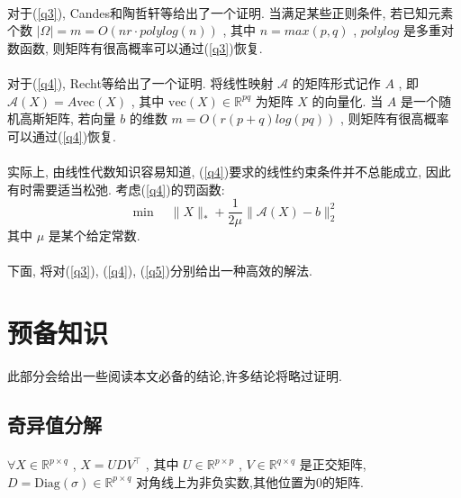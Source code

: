 \documentclass[a4paper, UTF8]{ctexart}				%
\numberwithin{equation}{section}				%
\begin{document}
			\paragraph{}
				\quad 对于(\ref{q3}), Candes和陶哲轩等给出了一个证明. 当满足某些正则条件, 若已知元素个数 $\lvert{\Omega}\rvert = m = O(nr \cdot polylog(n))$ , 其中 $n=max(p,q)$ , $polylog$ 是多重对数函数, 则矩阵有很高概率可以通过(\ref{q3})恢复.

			\paragraph{}
				\quad 对于(\ref{q4}), Recht等给出了一个证明. 将线性映射 $\mathcal{A}$ 的矩阵形式记作 $A$ , 即 $\mathcal{A}(X) = A\text{vec}(X)$ , 其中 $\text{vec}(X) \in \mathbb{R}^{pq}$ 为矩阵 $X$ 的向量化. 当 $A$ 是一个随机高斯矩阵, 若向量 $b$ 的维数 $m = O(r(p + q)log(pq))$ , 则矩阵有很高概率可以通过(\ref{q4})恢复.

			\paragraph{}
				\quad 实际上, 由线性代数知识容易知道, (\ref{q4})要求的线性约束条件并不总能成立, 因此有时需要适当松弛. 考虑(\ref{q4})的罚函数:
				\begin{equation}\label{q5}
					\min \quad \lVert{X}\rVert_*+ \frac{1}{2\mu} \lVert{\mathcal{A}(X) - b}\rVert_2^2
				\end{equation}
				其中 $\mu$ 是某个给定常数.

			\paragraph{}
				\quad 下面, 将对(\ref{q3}), (\ref{q4}), (\ref{q5})分别给出一种高效的解法.

	\section{预备知识}
		此部分会给出一些阅读本文必备的结论,许多结论将略过证明.
		\subsection{奇异值分解}
			\paragraph{}
				\quad $\forall X \in \mathbb{R}^{p \times q}$ , $X = U D V^\top$ , 其中 $U \in \mathbb{R}^{p \times p}$ , $V \in \mathbb{R}^{q \times q}$ 是正交矩阵, $ D = \text{Diag}(\sigma) \in \mathbb{R}^{p \times q}$ 对角线上为非负实数,其他位置为0的矩阵.
\end{document}
